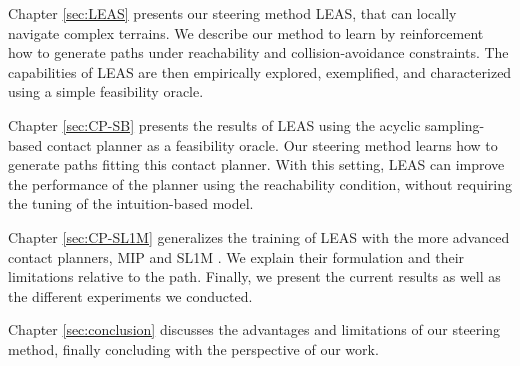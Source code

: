 Chapter \ref{sec:LEAS} presents our steering method LEAS, that can locally navigate complex terrains.
We describe our method to learn by reinforcement how to generate paths under reachability and collision-avoidance constraints.
The capabilities of LEAS are then empirically explored, exemplified, and characterized using a simple feasibility oracle.

Chapter \ref{sec:CP-SB} presents the results of LEAS using the acyclic sampling-based contact planner \cite{AcyclicCP} as a feasibility oracle.
Our steering method learns how to generate paths fitting this contact planner. 
With this setting, LEAS can improve the performance of the planner using the reachability condition, without requiring the tuning of the intuition-based model.

Chapter \ref{sec:CP-SL1M} generalizes the training of LEAS with the more advanced contact planners, MIP and SL1M \cite{sl1m_v2}.
We explain their formulation and their limitations relative to the path. Finally, we present the current results as well as the different experiments we conducted.

Chapter \ref{sec:conclusion} discusses the advantages and limitations of our steering method, finally concluding with the perspective of our work.
